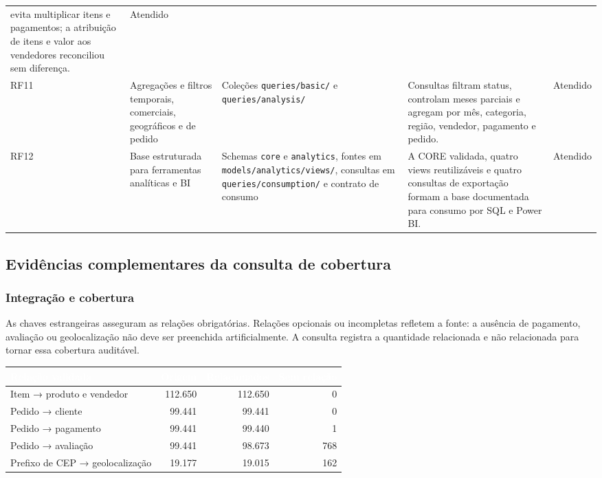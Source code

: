 \documentclass[12pt,a4paper]{article}
\newcounter{none}
\newcommand{\CabecalhoTabela}[1]{\textcolor{white}{\textbf{#1}}}
\begin{document}
\begin{landscape}
{\begin{longtable}{|>{\RaggedRight\arraybackslash}p{1.7cm}|>{\RaggedRight\arraybackslash}p{4.1cm}|>{\RaggedRight\arraybackslash}p{5.3cm}|>{\RaggedRight\arraybackslash}p{9.7cm}|>{\RaggedRight\arraybackslash}p{2.6cm}|}
evita multiplicar itens e pagamentos; a atribuição de itens e valor aos
vendedores reconciliou sem diferença. & Atendido \\
RF11 & Agregações e filtros temporais, comerciais, geográficos e de
pedido & Coleções \nolinkurl{queries/basic/} e
\nolinkurl{queries/analysis/} & Consultas filtram status, controlam
meses parciais e agregam por mês, categoria, região, vendedor, pagamento
e pedido. & Atendido \\
RF12 & Base estruturada para ferramentas analíticas e BI & Schemas
\nolinkurl{core} e \nolinkurl{analytics}, fontes em
\nolinkurl{models/analytics/views/}, consultas em
\nolinkurl{queries/consumption/} e contrato de consumo & A CORE validada,
quatro views reutilizáveis e quatro consultas de exportação formam a base
documentada para consumo por SQL e Power BI. & Atendido \\
\end{longtable}
}
\end{landscape}

\subsection{Evidências complementares da consulta de
cobertura}\label{docs__analytics__matriz_validacao_requisitos_funcionais.md__eviduxeancias-complementares-da-consulta-de-cobertura}

\subsubsection{Integração e
cobertura}\label{docs__analytics__matriz_validacao_requisitos_funcionais.md__integrauxe7uxe3o-e-cobertura}

As chaves estrangeiras asseguram as relações obrigatórias. Relações
opcionais ou incompletas refletem a fonte: a ausência de pagamento,
avaliação ou geolocalização não deve ser preenchida artificialmente. A
consulta registra a quantidade relacionada e não relacionada para tornar
essa cobertura auditável.

{\def\LTcaptype{none} %
\begin{longtable}[]{@{}lrrr@{}}
\toprule\noalign{}
\rowcolor{AzulCorporativo}
\CabecalhoTabela{Relação validada} & \CabecalhoTabela{Origem} & \CabecalhoTabela{Relacionados} & \CabecalhoTabela{Sem relação} \\
\midrule\noalign{}
\endhead
\bottomrule\noalign{}
\endlastfoot
Item → produto e vendedor & 112.650 & 112.650 & 0 \\
Pedido → cliente & 99.441 & 99.441 & 0 \\
Pedido → pagamento & 99.441 & 99.440 & 1 \\
Pedido → avaliação & 99.441 & 98.673 & 768 \\
Prefixo de CEP → geolocalização & 19.177 & 19.015 & 162 \\
\end{longtable}
}
\end{document}
